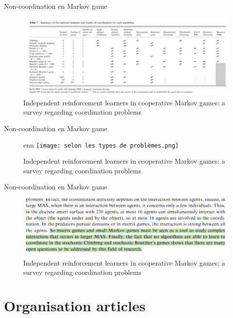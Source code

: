 \documentclass[aspectratio=169,xcolor=dvipsnames]{beamer}
\begin{document}
\begin{frame}{Non-coordination en Markov game}
  \begin{figure}
    \centering
    \includegraphics[scale=0.20]{Jeu et performance agent.png}
    \caption{\citet{matignon_independent_2012} Independent reinforcement learners in cooperative Markov games: a survey regarding coordination problems}
  \end{figure}
\end{frame}

\begin{frame}{Non-coordination en Markov game}
  \begin{figure}enn
    \centering
    \texttt{[image: selon les types de problèmes.png]}
    \caption{\citet{matignon_independent_2012} Independent reinforcement learners in cooperative Markov games: a survey regarding coordination problems}
  \end{figure}
\end{frame}

\begin{frame}{Non-coordination en Markov game}
  \begin{figure}
    \centering
    \includegraphics[scale=0.20]{Encouragement.png}
    \caption{\citet{matignon_independent_2012} Independent reinforcement learners in cooperative Markov games: a survey regarding coordination problems}
  \end{figure}
\end{frame}




\section{Organisation articles}
\end{document}

